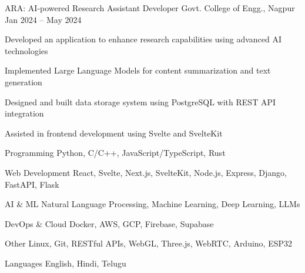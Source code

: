 \documentclass[11pt, a4paper]{awesome-cv}
\begin{document}

\begin{cventries}

\cventry
  {ARA: AI-powered Research Assistant}
  {Developer}
  {Govt. College of Engg., Nagpur}
  {Jan 2024 -- May 2024}
  {
    \begin{cvitems}
      \item {Developed an application to enhance research capabilities using advanced AI technologies}
      \item {Implemented Large Language Models for content summarization and text generation}
      \item {Designed and built data storage system using PostgreSQL with REST API integration}
      \item {Assisted in frontend development using Svelte and SvelteKit}
    \end{cvitems}
  }

\end{cventries}


\begin{cvskills}

\cvskill
  {Programming}
  {Python, C/C++, JavaScript/TypeScript, Rust}

\cvskill
  {Web Development}
  {React, Svelte, Next.js, SvelteKit, Node.js, Express, Django, FastAPI, Flask}

\cvskill
  {AI \& ML}
  {Natural Language Processing, Machine Learning, Deep Learning, LLMs}

\cvskill
  {DevOps \& Cloud}
  {Docker, AWS, GCP, Firebase, Supabase}

\cvskill
  {Other}
  {Linux, Git, RESTful APIs, WebGL, Three.js, WebRTC, Arduino, ESP32}

\cvskill
  {Languages}
  {English, Hindi, Telugu}

\end{cvskills}

\end{document}
